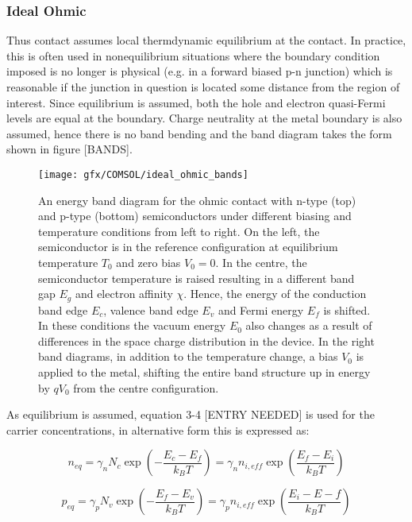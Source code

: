 \subsubsection{Ideal Ohmic}
Thus contact assumes local thermdynamic equilibrium at the contact. In practice, this is often used in nonequilibrium situations where the boundary condition imposed is no longer is physical (e.g. in a forward biased p-n junction) which is reasonable if the junction in question is located some distance from the region of interest. Since equilibrium is assumed, both the hole and electron quasi-Fermi levels are equal at the boundary. Charge neutrality at the metal boundary is also assumed, hence there is no band bending and the band diagram takes the form shown in figure [BANDS].
\begin{figure}
	\centering
	\texttt{[image: gfx/COMSOL/ideal\_ohmic\_bands]}
	\caption{An energy band diagram for the ohmic contact with n-type (top) and p-type (bottom) semiconductors under different biasing and temperature conditions from left to right. On the left, the semiconductor is in the reference configuration at equilibrium temperature $T_{0}$ and zero bias $V_{0}=0$. In the centre, the semiconductor temperature is raised resulting in a different band gap $E_{g}$ and electron affinity $\chi$. Hence, the energy of the conduction band edge $E_{c}$, valence band edge $E_{v}$ and Fermi energy $E_{f}$ is shifted. In these conditions the vacuum energy $E_{0}$ also changes as a result of differences in the space charge distribution in the device. In the right band diagrams, in addition to the temperature change, a bias $V_{0}$ is applied to the metal, shifting the entire band structure up in energy by $qV_{0}$ from the centre configuration.}
	\label{fig:idealohmicbands}
\end{figure}

As equilibrium is assumed, equation 3-4 [ENTRY NEEDED] is used for the carrier concentrations, in alternative form this is expressed as:

\begin{equation}
n_{eq}=\gamma_{n}N_{c}\exp\left(-\frac{E_{c}-E_{f}}{k_{B}T}\right)=\gamma_{n}n_{i,eff}\exp\left(\frac{E_{f}-E_{i}}{k_{B}T}\right)
\end{equation}

\begin{equation}
p_{eq}=\gamma_{p}N_{v}\exp\left(-\frac{E_{f}-E_{v}}{k_{B}T}\right)=\gamma_{p}n_{i,eff}\exp\left(\frac{E_{i}-E-{f}}{k_{B}T}\right)
\end{equation}

